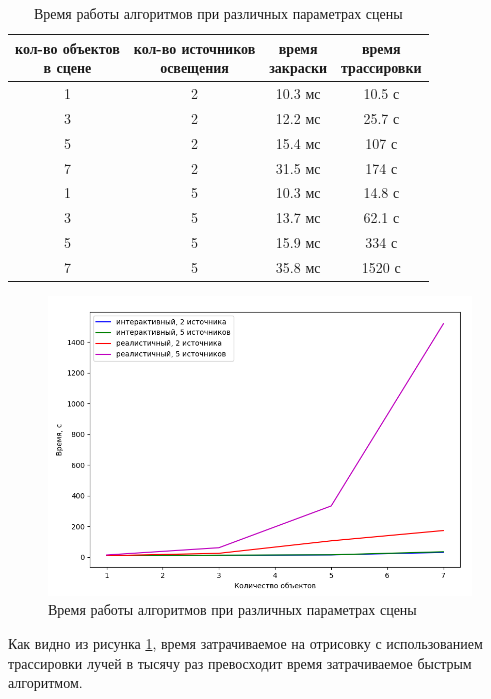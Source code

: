 \begin{table}[h]
	\caption{Время работы алгоритмов при различных параметрах сцены}
	\begin{center}
		\begin{tabular}{|c|c|c|c|}
			\hline
			\specialcell{кол-во объектов \\ в сцене} &
			\specialcell{кол-во источников \\ освещения} &
			\specialcell{время \\ закраски} &
			\specialcell{время \\ трассировки} \\
			\hline
			1 & 2 & 10.3 мс & 10.5 с \\
			\hline
			3 & 2 & 12.2 мс & 25.7 с \\
			\hline
			5 & 2 & 15.4 мс & 107 с \\
			\hline
			7 & 2 & 31.5 мс & 174 с \\
			\hline
			1 & 5 & 10.3 мс & 14.8 с \\
			\hline
			3 & 5 & 13.7 мс & 62.1 с \\
			\hline
			5 & 5 & 15.9 мс & 334 с \\
			\hline
			7 & 5 & 35.8 мс & 1520 с \\
			\hline
		\end{tabular}
	\end{center}
	\label{exp:res}
\end{table}

\begin{figure}[h]
	\centering
	\includegraphics[width=0.7\linewidth]{inc/img/graph}
	\caption{Время работы алгоритмов при различных параметрах сцены}
	\label{fig:graph}
\end{figure}


Как видно из рисунка \ref{fig:graph}, время затрачиваемое на отрисовку с использованием трассировки лучей в тысячу раз превосходит время затрачиваемое быстрым алгоритмом.

